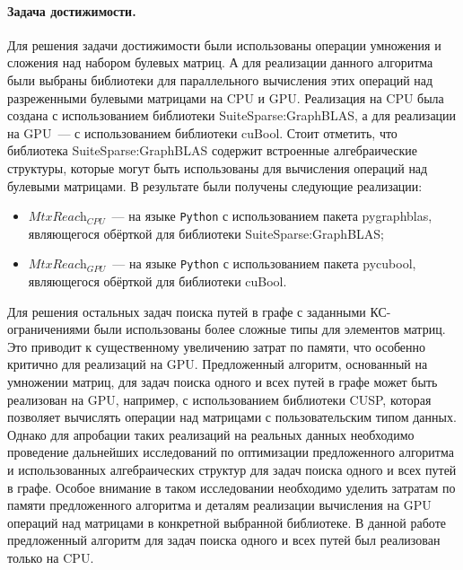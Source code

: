 \paragraph{Задача достижимости.} Для решения задачи достижимости были использованы операции умножения и сложения над набором булевых матриц. А для реализации данного алгоритма были выбраны библиотеки для параллельного вычисления этих операций над разреженными булевыми матрицами на CPU и GPU. Реализация на CPU была создана с использованием библиотеки SuiteSparse:GraphBLAS, а для реализации на GPU~--- с использованием библиотеки cuBool. Стоит отметить, что библиотека SuiteSparse:GraphBLAS содержит встроенные алгебраические структуры, которые могут быть использованы для вычисления операций над булевыми матрицами. В результате были получены следующие реализации:
\begin{itemize}
    \item $\textit{MtxReach}_{\textit{CPU}}$~--- на языке \texttt{Python} с использованием пакета pygraphblas, являющегося обёрткой для библиотеки SuiteSparse:GraphBLAS;
    \item $\textit{MtxReach}_{\textit{GPU}}$~--- на языке \texttt{Python} с использованием пакета pycubool, являющегося обёрткой для библиотеки cuBool.
\end{itemize}

Для решения остальных задач поиска путей в графе с заданными КС-ограничениями были использованы более сложные типы для элементов матриц. Это приводит к существенному увеличению затрат по памяти, что особенно критично для реализаций на GPU. Предложенный алгоритм, основанный на умножении матриц, для задач поиска одного и всех путей в графе может быть реализован на GPU, например, с использованием библиотеки CUSP, которая позволяет вычислять операции над матрицами с пользовательским типом данных. Однако для апробации таких реализаций на реальных данных необходимо проведение дальнейших исследований по оптимизации предложенного алгоритма и использованных алгебраических структур для задач поиска одного и всех путей в графе. Особое внимание в таком исследовании необходимо уделить затратам по памяти предложенного алгоритма и деталям реализации вычисления на GPU операций над матрицами в конкретной выбранной библиотеке. В данной работе предложенный алгоритм для задач поиска одного и всех путей был реализован только на CPU.

